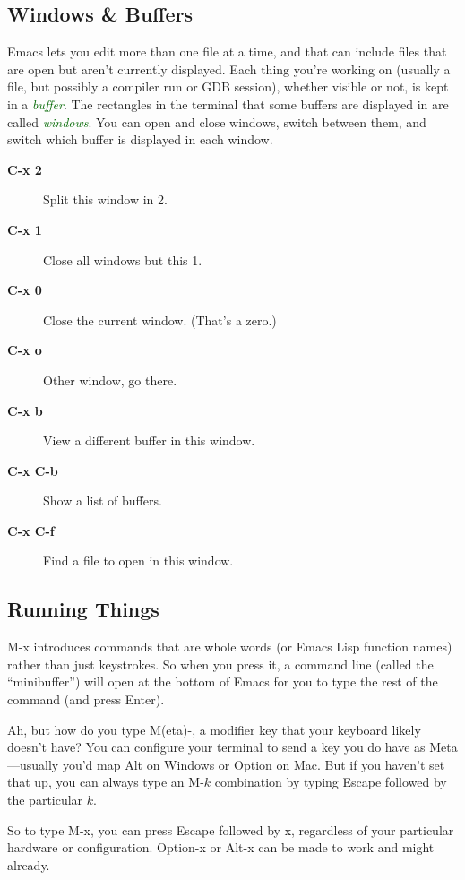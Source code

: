\documentclass[11pt]{article}
\newcommand\keyterm[1]{\textcolor[HTML]{006600}{\emph{#1}}}
\newcommand\keycombo[1]{{\sffamily\upshape\bfseries#1}}
\newenvironment{commands}
{\bgroup
  \let\olditem\item
  \def\item[##1]{\olditem[\keycombo{##1}]}%
  \begin{description}}
  {\end{description}\egroup}
\begin{document}
\begin{multicols}{2}
\subsection*{Windows \& Buffers}

Emacs lets you edit more than one file at a time, and that can include
  files that are open but aren’t currently displayed. Each thing you’re
  working on (usually a file, but possibly a compiler run or GDB
  session), whether visible or not, is kept in a \keyterm{buffer}. The
  rectangles in the terminal that some buffers are displayed in are called
  \keyterm{windows}. You can open and close windows, switch between them,
  and switch which buffer is displayed in each window.

\begin{commands}
\item[C-x 2] Split this window in 2.
\item[C-x 1] Close all windows but this 1.
\item[C-x 0] Close the current window. (That's a zero.)
\item[C-x o] Other window, go there.
\item[C-x b] View a different buffer in this window.
\item[C-x C-b] Show a list of buffers.
\item[C-x C-f] Find a file to open in this window.
\end{commands}

\subsection*{Running Things}

\textsf{M-x} introduces commands that are whole words (or Emacs Lisp
  function names) rather than just keystrokes. So when you press it, a
  command line (called the ``minibuffer'') will open at the bottom of
  Emacs for you to type the rest of the command (and press Enter).

  Ah, but how do you type \textsf{M(eta)-}, a modifier key that your
  keyboard likely doesn’t have? You can configure your terminal to send
  a key you do have as \textsf{Meta}—usually you’d map \textsf{Alt} on
  Windows or \textsf{Option} on Mac. But if you haven’t set that up, you
  can always type an \textsf{M-}$k$ combination by typing
  \textsf{Escape} followed by the particular $k$.

  So to type \textsf{M-x}, you can press \textsf{Escape} followed by
  \textsf{x}, regardless of your particular hardware or configuration.
  \textsf{Option-x} or \textsf{Alt-x} can be made to work and might
  already.


\end{multicols}
\end{document}
